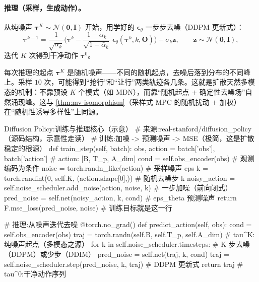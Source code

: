 \paragraph{推理（采样，生成动作）。}
从纯噪声 $\boldsymbol{\tau}^K\sim\mathcal{N}(\mathbf{0},\mathbf{I})$ 开始，用学好的 $\boldsymbol{\epsilon}_\theta$ 一步步去噪（DDPM 更新式）：
\begin{equation}
  \boldsymbol{\tau}^{k-1}=\frac{1}{\sqrt{\alpha_k}}\Big(\boldsymbol{\tau}^k-\frac{1-\alpha_k}{\sqrt{1-\bar\alpha_k}}\,\boldsymbol{\epsilon}_\theta(\boldsymbol{\tau}^k,k,\mathbf{O})\Big)+\sigma_k\mathbf{z},\qquad \mathbf{z}\sim\mathcal{N}(\mathbf{0},\mathbf{I}),
  \label{eq:de-reverse}
\end{equation}
迭代 $K$ 次得到干净动作 $\boldsymbol{\tau}^0$。

\begin{insight}
每次推理的起点 $\boldsymbol{\tau}^K$ 是随机噪声——不同的随机起点，去噪后落到分布的不同峰上。采样 $10$ 次，可能得到“抢行”和“让行”两类轨迹各几条。这就是扩散天然多模态的机制：不靠预设 $K$ 个模式（如 MDN），而靠“随机起点 $+$ 确定性去噪场”自然涌现峰。这与 \cref{thm:mv-isomorphism}（采样式 MPC 的随机扰动 $+$ 加权）在“随机性诱导多样性”上同源。
\end{insight}

\begin{codebox}[Python]{Diffusion Policy:训练与推理核心（示意）}
# 来源:real-stanford/diffusion_policy（源码结构，示意性走读）
# 训练:加噪 -> 预测噪声 -> MSE（极简，这是扩散稳定的根源）
def train_step(self, batch):
    obs, action = batch['obs'], batch['action']      # action: [B, T_p, A_dim]
    cond = self.obs_encoder(obs)                     # 观测编码为条件
    noise = torch.randn_like(action)                 # 采样噪声 eps
    k = torch.randint(0, self.K, (action.shape[0],)) # 随机去噪步 k
    noisy_action = self.noise_scheduler.add_noise(action, noise, k)  # 一步加噪（前向闭式）
    pred_noise = self.net(noisy_action, k, cond)     # eps_theta 预测噪声
    return F.mse_loss(pred_noise, noise)             # 训练目标就是这一行

# 推理:从噪声迭代去噪
@torch.no_grad()
def predict_action(self, obs):
    cond = self.obs_encoder(obs)
    traj = torch.randn(self.B, self.T_p, self.A_dim) # tau^K:纯噪声起点（多模态之源）
    for k in self.noise_scheduler.timesteps:         # K 步去噪（DDPM）或少步（DDIM）
        pred_noise = self.net(traj, k, cond)
        traj = self.noise_scheduler.step(pred_noise, k, traj)   # DDPM 更新式
    return traj                                      # tau^0:干净动作序列
\end{codebox}

